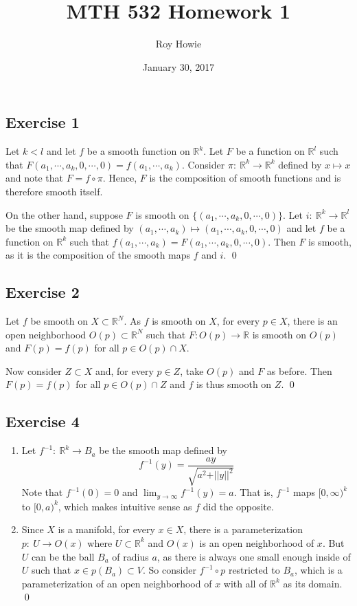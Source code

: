\documentclass{article}
\newcommand{\R}{\mathbb{R}}
\begin{document}
\title{MTH 532 Homework 1}
\author{Roy Howie}
\date{January 30, 2017}
\maketitle

\subsection*{Exercise 1}
  Let $k < l$ and let $f$ be a smooth function on $\R^k$. Let $F$ be a function
  on $\R^l$ such that $F(a_1,\cdots,a_k,0,\cdots,0)=f(a_1,\cdots,a_k)$. Consider
  $\pi \colon \ \R^k \to \R^k$ defined by $x \mapsto x$ and note that $F=f\circ
  \pi$. Hence, $F$ is the composition of smooth functions and is therefore
  smooth itself.

  On the other hand, suppose $F$ is smooth on $\{(a_1,\cdots,a_k,0,\cdots,0)\}$.
  Let $i \colon \ \R^k \to \R^l$ be the smooth map defined by $(a_1,\cdots,a_k)
  \mapsto (a_1,\cdots,a_k,0,\cdots,0)$ and let $f$ be a function on $\R^k$ such
  that $f(a_1,\cdots,a_k)=F(a_1,\cdots,a_k,0,\cdots,0)$. Then $F$ is smooth, as
  it is the composition of the smooth maps $f$ and $i$.
  \qed

\subsection*{Exercise 2}
  Let $f$ be smooth on $X \subset \R^N$. As $f$ is smooth on $X$, for every $p
  \in X$, there is an open neighborhood $O(p)\subset\R^N$ such that $F\colon
  O(p)\to\R$ is smooth on $O(p)$ and $F(p)=f(p)$ for all $p\in O(p)\cap X$.

  Now consider $Z\subset X$ and, for every $p\in Z$, take $O(p)$ and $F$ as
  before. Then $F(p)=f(p)$ for all $p\in O(p)\cap Z$ and $f$ is thus smooth on
  $Z$.
  \qed

\subsection*{Exercise 4}
  \begin{enumerate}[label=\textbf{\alph*}]
    \item{
      Let $f^{-1} \colon \ \R^k \to B_a$ be the smooth map defined by
      $$f^{-1}(y) = \frac{ay}{\sqrt{a^2 + \vert\vert y \vert\vert^2}}$$
      Note that $f^{-1}(0)=0$ and $\lim_{y\to \infty}f^{-1}(y)=a$. That is,
      $f^{-1}$ maps $[0,\infty)^k$ to $[0,a)^k$, which makes intuitive sense as
      $f$ did the opposite.
    }
    \item{
      Since $X$ is a manifold, for every $x \in X$, there is a parameterization
      $p\colon\ U\to O(x)$ where $U\subset\R^k$ and $O(x)$ is an open
      neighborhood of $x$. But $U$ can be the ball $B_a$ of radius $a$, as there
      is always one small enough inside of $U$ such that $x\in p(B_a)\subset V$.
      So consider $f^{-1}\circ p$ restricted to $B_a$, which is a
      parameterization of an open neighborhood of $x$ with all of $\R^k$ as its
      domain.
    }
    \qed
  \end{enumerate}
\end{document}
